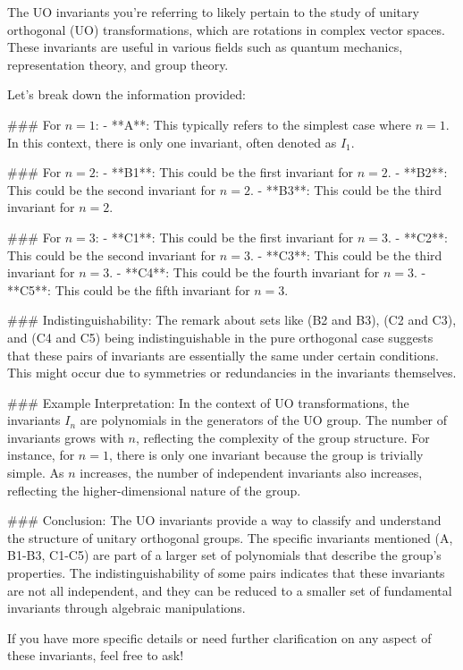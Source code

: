 The UO invariants you're referring to likely pertain to the study of unitary orthogonal (UO) transformations, which are rotations in complex vector spaces. These invariants are useful in various fields such as quantum mechanics, representation theory, and group theory.

Let's break down the information provided:

### For \( n = 1 \):
- **A**: This typically refers to the simplest case where \( n = 1 \). In this context, there is only one invariant, often denoted as \( I_1 \).

### For \( n = 2 \):
- **B1**: This could be the first invariant for \( n = 2 \).
- **B2**: This could be the second invariant for \( n = 2 \).
- **B3**: This could be the third invariant for \( n = 2 \).

### For \( n = 3 \):
- **C1**: This could be the first invariant for \( n = 3 \).
- **C2**: This could be the second invariant for \( n = 3 \).
- **C3**: This could be the third invariant for \( n = 3 \).
- **C4**: This could be the fourth invariant for \( n = 3 \).
- **C5**: This could be the fifth invariant for \( n = 3 \).

### Indistinguishability:
The remark about sets like (B2 and B3), (C2 and C3), and (C4 and C5) being indistinguishable in the pure orthogonal case suggests that these pairs of invariants are essentially the same under certain conditions. This might occur due to symmetries or redundancies in the invariants themselves.

### Example Interpretation:
In the context of UO transformations, the invariants \( I_n \) are polynomials in the generators of the UO group. The number of invariants grows with \( n \), reflecting the complexity of the group structure. For instance, for \( n = 1 \), there is only one invariant because the group is trivially simple. As \( n \) increases, the number of independent invariants also increases, reflecting the higher-dimensional nature of the group.

### Conclusion:
The UO invariants provide a way to classify and understand the structure of unitary orthogonal groups. The specific invariants mentioned (A, B1-B3, C1-C5) are part of a larger set of polynomials that describe the group's properties. The indistinguishability of some pairs indicates that these invariants are not all independent, and they can be reduced to a smaller set of fundamental invariants through algebraic manipulations.

If you have more specific details or need further clarification on any aspect of these invariants, feel free to ask!